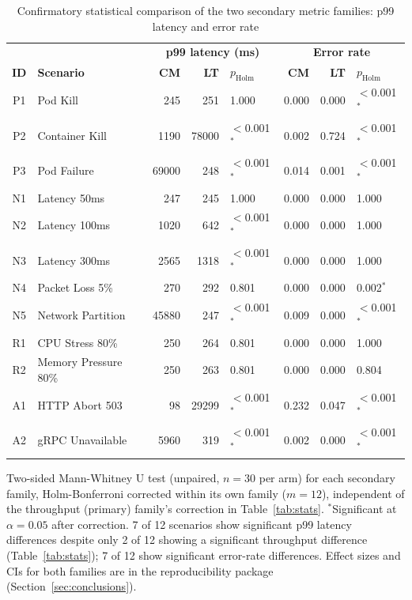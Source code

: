 \begin{table}[ht]
\centering
\caption{Confirmatory statistical comparison of the two secondary metric families: p99 latency and error rate}
\label{tab:stats-secondary}
\small
\begin{tabular}{clrrlrrl}
\hline
\multicolumn{2}{c}{} & \multicolumn{3}{c}{\textbf{p99 latency (ms)}} & \multicolumn{3}{c}{\textbf{Error rate}} \\
\textbf{ID} & \textbf{Scenario} & \textbf{CM} & \textbf{LT} & \textbf{$p_{\mathrm{Holm}}$} & \textbf{CM} & \textbf{LT} & \textbf{$p_{\mathrm{Holm}}$} \\
\hline
P1 & Pod Kill & 245 & 251 & 1.000 & 0.000 & 0.000 & $<$0.001$^*$ \\
P2 & Container Kill & 1190 & 78000 & $<$0.001$^*$ & 0.002 & 0.724 & $<$0.001$^*$ \\
P3 & Pod Failure & 69000 & 248 & $<$0.001$^*$ & 0.014 & 0.001 & $<$0.001$^*$ \\
N1 & Latency 50ms & 247 & 245 & 1.000 & 0.000 & 0.000 & 1.000 \\
N2 & Latency 100ms & 1020 & 642 & $<$0.001$^*$ & 0.000 & 0.000 & 1.000 \\
N3 & Latency 300ms & 2565 & 1318 & $<$0.001$^*$ & 0.000 & 0.000 & 1.000 \\
N4 & Packet Loss 5\% & 270 & 292 & 0.801 & 0.000 & 0.000 & 0.002$^*$ \\
N5 & Network Partition & 45880 & 247 & $<$0.001$^*$ & 0.009 & 0.000 & $<$0.001$^*$ \\
R1 & CPU Stress 80\% & 250 & 264 & 0.801 & 0.000 & 0.000 & 1.000 \\
R2 & Memory Pressure 80\% & 250 & 263 & 0.801 & 0.000 & 0.000 & 0.804 \\
A1 & HTTP Abort 503 & 98 & 29299 & $<$0.001$^*$ & 0.232 & 0.047 & $<$0.001$^*$ \\
A2 & gRPC Unavailable & 5960 & 319 & $<$0.001$^*$ & 0.002 & 0.000 & $<$0.001$^*$ \\
\hline
\end{tabular}
\vspace{2mm}
\raggedright\footnotesize Two-sided Mann-Whitney U test (unpaired, $n=30$ per arm) for each secondary family, Holm-Bonferroni corrected within its own family ($m=12$), independent of the throughput (primary) family's correction in Table~\ref{tab:stats}. $^*$Significant at $\alpha=0.05$ after correction. 7 of 12 scenarios show significant p99 latency differences despite only 2 of 12 showing a significant throughput difference (Table~\ref{tab:stats}); 7 of 12 show significant error-rate differences. Effect sizes and CIs for both families are in the reproducibility package (Section~\ref{sec:conclusions}).
\end{table}